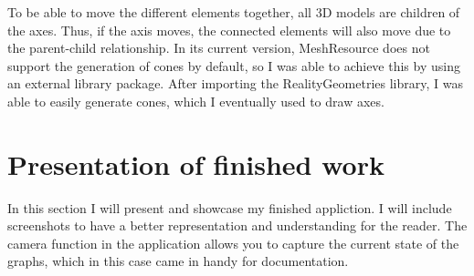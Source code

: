 \documentclass[11pt,a4paper,oneside]{report}
\begin{document}
To be able to move the different elements together, all 3D models are children of the axes. Thus, if the axis moves, the connected elements will also move due to the parent-child relationship. In its current version, MeshResource does not support the generation of cones by default, so I was able to achieve this by using an external library package. After importing the RealityGeometries library, I was able to easily generate cones, which I eventually used to draw axes.

\chapter{Presentation of finished work}

In this section I will present and showcase my finished appliction. I will include screenshots to have a better representation and understanding for the reader.
The camera function in the application allows you to capture the current state of the graphs, which in this case came in handy for documentation.
\end{document}
